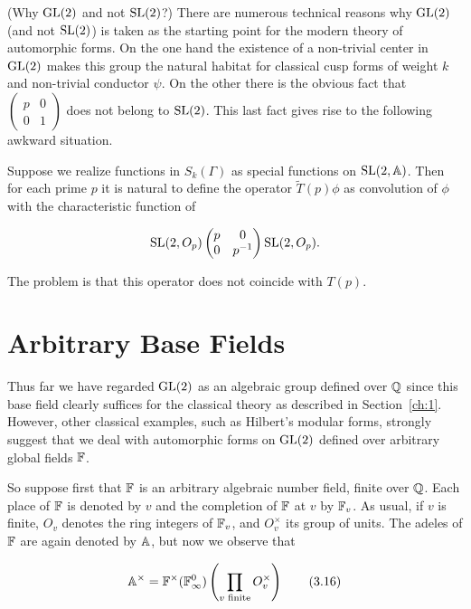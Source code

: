 \begin{remark}\label{rem:3.8}

(Why $\operatorname{GL}(2)$ and not $\operatorname{SL}(2)$?) There are numerous technical reasons why $\operatorname{GL}(2)$ (and not $\operatorname{SL}(2)$) is taken as the starting point for the modern theory of automorphic forms. On the one hand the existence of a non-trivial center in $\operatorname{GL}(2)$ makes this group the natural habitat for classical cusp forms of weight $k$ and non-trivial conductor $\psi$. On the other there is the obvious fact that $\begin{pmatrix} p & 0 \\ 0 & 1 \end{pmatrix}$ does not belong to $\operatorname{SL}(2)$. This last fact gives rise to the following awkward situation.

Suppose we realize functions in $S_k(\Gamma)$ as special functions on $\operatorname{SL}(2,\mathbb{A})$. Then for each prime $p$ it is natural to define the operator $\tilde{T}(p)\phi$ as convolution of $\phi$ with the characteristic function of

\[
\operatorname{SL}(2,O_p)\begin{pmatrix} p & 0 \\ 0 & p^{-1} \end{pmatrix}\operatorname{SL}(2,O_p).
\]

The problem is that this operator does not coincide with $T(p)$.

\end{remark}

\section{Arbitrary Base Fields}\label{sec:3c}

Thus far we have regarded $\operatorname{GL}(2)$ as an algebraic group defined over $\mathbb{Q}$ since this base field clearly suffices for the classical theory as described in Section~\ref{ch:1}. However, other classical examples, such as Hilbert's modular forms, strongly suggest that we deal with automorphic forms on $\operatorname{GL}(2)$ defined over arbitrary global fields $\mathbb{F}$.

So suppose first that $\mathbb{F}$ is an arbitrary algebraic number field, finite over $\mathbb{Q}$. Each place of $\mathbb{F}$ is denoted by $v$ and the completion of $\mathbb{F}$ at $v$ by $\mathbb{F}_v$. As usual, if $v$ is finite, $O_v$ denotes the ring integers of $\mathbb{F}_v$, and $O_v^{\times}$ its group of units. The adeles of $\mathbb{F}$ are again denoted by $\mathbb{A}$, but now we observe that

\begin{equation}\label{eq:3.16}
\mathbb{A}^{\times} = \mathbb{F}^{\times}(\mathbb{F}_\infty^0)\left(\prod_{v\text{ finite}}O_v^{\times}\right)\tag{3.16}
\end{equation}

